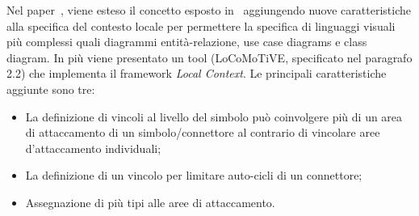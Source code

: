         

        \noindent
        Nel paper~\cite{extending_localcontext}, viene esteso il concetto esposto in~\cite{localcontext_recognition} aggiungendo nuove caratteristiche alla specifica del contesto locale per permettere la specifica di linguaggi visuali più complessi quali diagrammi entità-relazione, use case diagrams e class diagram. In più viene presentato un tool (LoCoMoTiVE, specificato nel paragrafo 2.2) che implementa il framework \textit{Local Context}.
        \newline
        Le principali caratteristiche aggiunte sono tre:
        \begin{itemize}
            \item La definizione di vincoli al livello del simbolo può coinvolgere più di un area di attaccamento di un simbolo/connettore al contrario di vincolare aree d'attaccamento individuali;
            \item La definizione di un vincolo per limitare auto-cicli di un connettore;
            \item Assegnazione di più tipi alle aree di attaccamento.
        \end{itemize}


